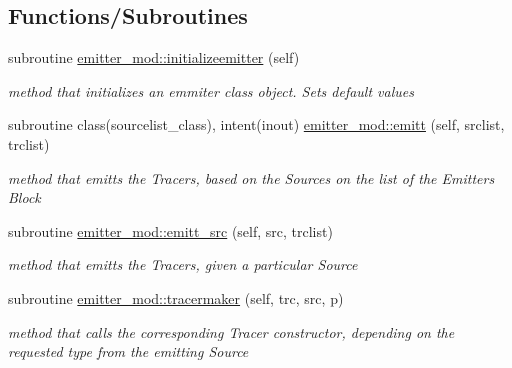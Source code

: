 \subsection*{Functions/\+Subroutines}
\begin{DoxyCompactItemize}
\item 
subroutine \mbox{\hyperlink{namespaceemitter__mod_a6376ad0f8e1739b29caf672aa0750373}{emitter\+\_\+mod\+::initializeemitter}} (self)
\begin{DoxyCompactList}\small\item\em method that initializes an emmiter class object. Sets default values \end{DoxyCompactList}\item 
subroutine class(sourcelist\+\_\+class), intent(inout) \mbox{\hyperlink{namespaceemitter__mod_a5127564ae5d2f00d214c1518ac420da7}{emitter\+\_\+mod\+::emitt}} (self, srclist, trclist)
\begin{DoxyCompactList}\small\item\em method that emitts the Tracers, based on the Sources on the list of the Emitter\textquotesingle{}s Block \end{DoxyCompactList}\item 
subroutine \mbox{\hyperlink{namespaceemitter__mod_a942679c07927fa594173fdd02da38922}{emitter\+\_\+mod\+::emitt\+\_\+src}} (self, src, trclist)
\begin{DoxyCompactList}\small\item\em method that emitts the Tracers, given a particular Source \end{DoxyCompactList}\item 
subroutine \mbox{\hyperlink{namespaceemitter__mod_aee7b24637d2249727bccab333e062516}{emitter\+\_\+mod\+::tracermaker}} (self, trc, src, p)
\begin{DoxyCompactList}\small\item\em method that calls the corresponding Tracer constructor, depending on the requested type from the emitting Source \end{DoxyCompactList}\end{DoxyCompactItemize}

